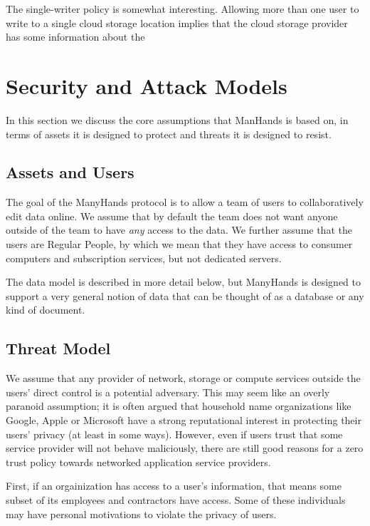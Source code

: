 \documentclass[pldi,10pt,preprint]{sigplanconf-pldi16}
\begin{document}
The single-writer policy is somewhat interesting.
Allowing more than one user to write to a single cloud storage location implies that the cloud storage provider has some information about the 

\section{Security and Attack Models}

In this section we discuss the core assumptions that ManHands is based on, in terms of assets it is designed to protect and threats it is designed to resist.

\subsection{Assets and Users}

The goal of the ManyHands protocol is to allow a team of users to collaboratively edit data online.
We assume that by default the team does not want anyone outside of the team to have \emph{any} access to the data.
We further assume that the users are Regular People\texttrademark, by which we mean that they have access to consumer computers and subscription services, but not dedicated servers.

The data model is described in more detail below, but ManyHands is designed to support a very general notion of data that can be thought of as a database or any kind of document.

\subsection{Threat Model}

We assume that any provider of network, storage or compute services outside the users' direct control is a potential adversary.
This may seem like an overly paranoid assumption; it is often argued that household name organizations like Google, Apple or Microsoft have a strong reputational interest in protecting their users' privacy (at least in some ways).
However, even if users trust that some service provider will not behave maliciously, there are still good reasons for a zero trust policy towards networked application service providers.

First, if an orgainization has access to a user's information, that means some subset of its employees and contractors have access.
Some of these individuals may have personal motivations to violate the privacy of users.
\end{document}
